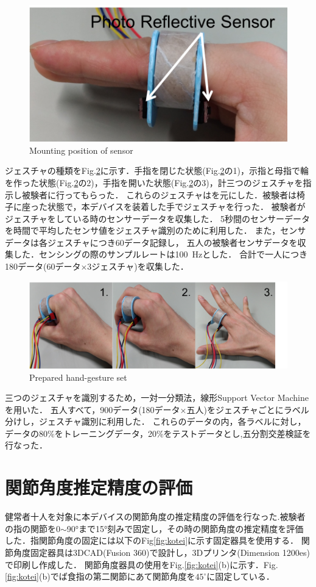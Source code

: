 \begin{figure}[H]
  \centering
  \includegraphics[width=0.6\linewidth]{fig/sensor}
  \caption{Mounting position of sensor}
  \label{fig:sensor}
\end{figure}

ジェスチャの種類をFig.\ref{fig:gesture}に示す．手指を閉じた状態(Fig.\ref{fig:gesture}の1)，示指と母指で輪を作った状態(Fig.\ref{fig:gesture}の2)，手指を開いた状態(Fig.\ref{fig:gesture}の3)，計三つのジェスチャを指示し被験者に行ってもらった．
これらのジェスチャは\cite{Lin2015}を元にした．被験者は椅子に座った状態で，本デバイスを装着した手でジェスチャを行った．
被験者がジェスチャをしている時のセンサーデータを収集した．
5秒間のセンサーデータを時間で平均したセンサ値をジェスチャ識別のために利用した．
また，センサデータは各ジェスチャにつき60データ記録し，
五人の被験者センサデータを収集した．センシングの際のサンプルレートは100\ Hzとした．
合計で一人につき180データ(60データ$\times$3ジェスチャ)を収集した．

\begin{figure}[H]
  \centering
  \includegraphics[width=0.8\linewidth]{fig/gesture}
  \caption{Prepared hand-gesture set}
  \label{fig:gesture}
\end{figure}

三つのジェスチャを識別するため，一対一分類法，線形Support Vector Machineを用いた．
五人すべて，900データ(180データ$\times$五人)をジェスチャごとにラベル分けし，ジェスチャ識別に利用した．
これらのデータの内，各ラベルに対し，データの80\%をトレーニングデータ，20\%をテストデータとし,五分割交差検証を行なった．


\section{関節角度推定精度の評価}
健常者十人を対象に本デバイスの関節角度の推定精度の評価を行なった.被験者の指の関節を0$\sim$90°まで15°刻みで固定し，その時の関節角度の推定精度を評価した．指関節角度の固定には以下のFig\ref{fig:kotei}に示す固定器具を使用する．
関節角度固定器具は3DCAD(Fusion 360)で設計し，3Dプリンタ(Dimension 1200es)で印刷し作成した．
関節角度器具の使用をFig.\ref{fig:kotei}(b)に示す．Fig.\ref{fig:kotei}(b)でば食指の第二関節にあて関節角度を$45^\circ$に固定している．

